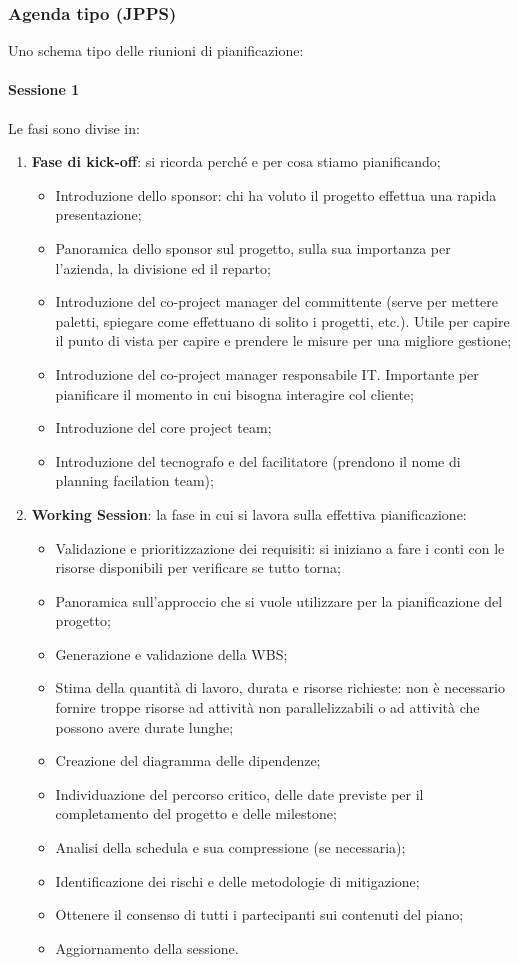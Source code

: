 \subsubsection{Agenda tipo (JPPS)}
Uno schema tipo delle riunioni di pianificazione:
\paragraph{Sessione 1}
Le fasi sono divise in:
\begin{enumerate}
	\item \textbf{Fase di kick-off}: si ricorda perché e per cosa stiamo pianificando;
	\begin{itemize}
		\item Introduzione dello sponsor: chi ha voluto il progetto effettua una rapida presentazione;
		\item Panoramica dello sponsor sul progetto, sulla sua importanza per l'azienda, la divisione ed il reparto;
		\item Introduzione del co-project manager del committente (serve per mettere paletti, spiegare come effettuano di solito i progetti, etc.). Utile per capire il punto di vista per capire e prendere le misure per una migliore gestione;
		\item Introduzione del co-project manager responsabile IT. Importante per pianificare il momento in cui bisogna interagire col cliente;
		\item Introduzione del core project team;
		\item Introduzione del tecnografo e del facilitatore (prendono il nome di planning facilation team);
	\end{itemize}
	\item \textbf{Working Session}: la fase in cui si lavora sulla effettiva pianificazione:
	\begin{itemize}
		\item Validazione e prioritizzazione dei requisiti: si iniziano a fare i conti con le risorse disponibili per verificare se tutto torna;
		\item Panoramica sull'approccio che si vuole utilizzare per la pianificazione del progetto;
		\item Generazione e validazione della WBS;
		\item Stima della quantità di lavoro, durata e risorse richieste: non è necessario fornire troppe risorse ad attività non parallelizzabili o ad attività che possono avere durate lunghe;
		\item Creazione del diagramma delle dipendenze;
		\item Individuazione del percorso critico, delle date previste per il completamento del progetto e delle milestone;
		\item Analisi della schedula e sua compressione (se necessaria);
		\item Identificazione dei rischi e delle metodologie di mitigazione;
		\item Ottenere il consenso di tutti i partecipanti sui contenuti del piano;
		\item Aggiornamento della sessione.
	\end{itemize}
\end{enumerate}
